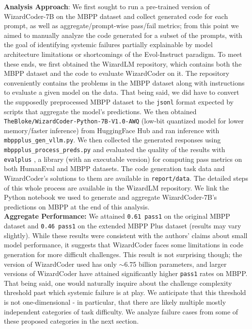 \documentclass[10pt]{article}
\newcommand{\code}[1]{\texttt{#1}}
\theoremstyle{definition}
\begin{document}
\noindent\textbf{Analysis Approach}: We first sought to run a pre-trained version of WizardCoder-7B on the MBPP dataset and collect generated code for each prompt, as well as aggregate/prompt-wise pass/fail metrics; from this point we aimed to manually analyze the code generated for a subset of the prompts, with the goal of identifying systemic failures partially explainable by model architecture limitations or shortcomings of the Evol-Instruct paradigm. To meet these ends, we first obtained the WizardLM repository, which contains both the MBPP dataset and the code to evaluate WizardCoder on it. The repository conveniently contains the problems in the MBPP dataset along with instructions to evaluate a given model on the data. That being said, we did have to convert the supposedly preprocessed MBPP dataset to the \code{jsonl} format expected by scripts that aggregate the model's predictions. We then obtained \code{TheBloke/WizardCoder-Python-7B-V1.0-AWQ} (low-bit quantized model for lower memory/faster inference) from HuggingFace Hub and ran inference with \code{mbppplus\_gen\_vllm.py}. We then collected the generated responses using \code{mbppplus\_process\_preds.py} and evaluated the quality of the results with \code{evalplus} \cite{evalplus}, a library (with an executable version) for computing pass metrics on both HumanEval and MBPP datasets. The code generation task data and WizardCoder's solutions to them are available in \code{report/data}. The detailed steps of this whole process are available in the WizardLM repository. We link the Python notebook we used to generate and aggregate WizardCoder-7B's predictions on MBPP at the end of this analysis.\\

\noindent\textbf{Aggregate Performance:} We attained \code{0.61 pass1} on the original MBPP dataset and \code{0.46 pass1} on the extended MBPP Plus dataset (results may vary slightly). While these results were consistent with the authors' claims about small model performance, it suggests that WizardCoder faces some limitations in code generation for more difficult challenges. This result is not surprising though; the version of WizardCoder used has only $\sim$6.75 billion parameters, and larger versions of WizardCoder have attained significantly higher \code{pass1} rates on MBPP. That being said, one would naturally inquire about the challenge complexity threshold past which systemic failure is at play. We anticipate that this threshold is not one-dimensional - in particular, that there are likely multiple mostly independent categories of task difficulty. We analyze failure cases from some of these proposed categories in the next section.
\end{document}
